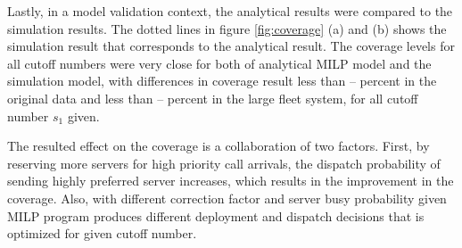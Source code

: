 \documentclass{article}
\begin{document}
Lastly, in a model validation context, the analytical results were compared to the simulation results. The dotted lines in figure \ref{fig:coverage} (a) and (b) shows the simulation result that corresponds to the analytical result. The coverage levels for all cutoff numbers were very close for both of analytical MILP model and the simulation model, with differences in coverage result less than -- percent in the original data and less than -- percent in the large fleet system, for all cutoff number $s_1$ given.

The resulted effect on the coverage is a collaboration of two factors. First, by reserving more servers for high priority call arrivals, the dispatch probability of sending highly preferred server increases, which results in the improvement in the coverage. Also, with different correction factor and server busy probability given MILP program produces different deployment and dispatch decisions that is optimized for given cutoff number. %


\end{document}
